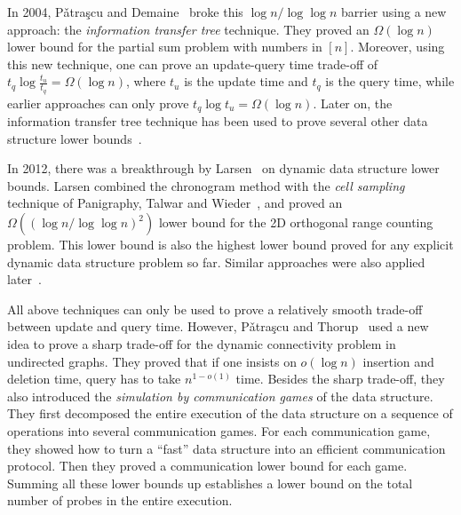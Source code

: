 \documentclass[11pt]{article}
\begin{document}
In 2004, P\v{a}tra\c{s}cu and Demaine~\cite{PD04a} broke this $\log n/\log\log n$ barrier using a new approach: the \emph{information transfer tree} technique. They proved an $\Omega(\log n)$ lower bound for the partial sum problem with numbers in $[n]$. Moreover, using this new technique, one can prove an update-query time trade-off of $t_q\log\frac{t_u}{t_q}=\Omega(\log n)$, where $t_u$ is the update time and $t_q$ is the query time, while earlier approaches can only prove $t_q\log t_u=\Omega(\log n)$. Later on, the information transfer tree technique has been used to prove several other data structure lower bounds~\cite{PD04b, CJS15, CJ11, CJS13}.

In 2012, there was a breakthrough by Larsen~\cite{Larsen12a} on dynamic data structure lower bounds. Larsen combined the chronogram method with the \emph{cell sampling} technique of Panigraphy, Talwar and Wieder~\cite{PTW10}, and proved an $\Omega((\log n/\log\log n)^2)$ lower bound for the 2D orthogonal range counting problem. This lower bound is also the highest lower bound proved for any explicit dynamic data structure problem so far. Similar approaches were also applied later~\cite{Larsen12b, CGL15}. 

All above techniques can only be used to prove a relatively smooth trade-off between update and query time. However, P\v{a}tra\c{s}cu and Thorup~\cite{PT11} used a new idea to prove a sharp trade-off for the dynamic connectivity problem in undirected graphs. They proved that if one insists on $o(\log n)$ insertion and deletion time, query has to take $n^{1-o(1)}$ time. Besides the sharp trade-off, they also introduced the \emph{simulation by communication games} of the data structure. They first decomposed the entire execution of the data structure on a sequence of operations into several communication games. For each communication game, they showed how to turn a ``fast'' data structure into an efficient communication protocol. Then they proved a communication lower bound for each game. Summing all these lower bounds up establishes a lower bound on the total number of probes in the entire execution. 
\end{document}
